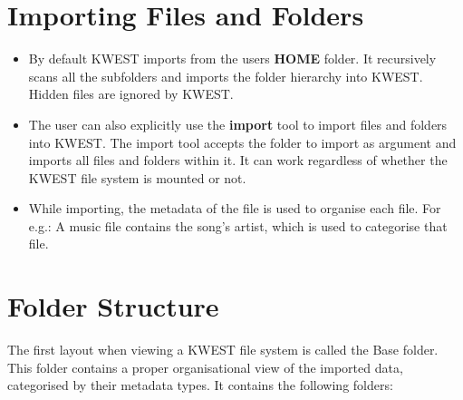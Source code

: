 \section{Importing Files and Folders}

\begin{itemize}
\item By default KWEST imports from the users \textbf{HOME} folder. It recursively scans all the subfolders and imports the folder hierarchy into KWEST. Hidden files are ignored by KWEST.

\item The user can also explicitly use the \textbf{import} tool to import files and folders into KWEST. The import tool accepts the folder to import as argument and imports all files and folders within it. It can work regardless of whether the KWEST file system is mounted or not.

\item While importing, the metadata of the file is used to organise each file. For e.g.: A music file contains the song's artist, which is used to categorise that file.
\end{itemize}

\section{Folder Structure}

The first layout when viewing a KWEST file system is called the Base folder. This folder contains a proper organisational view of the imported data, categorised by their metadata types. It contains the following folders:

